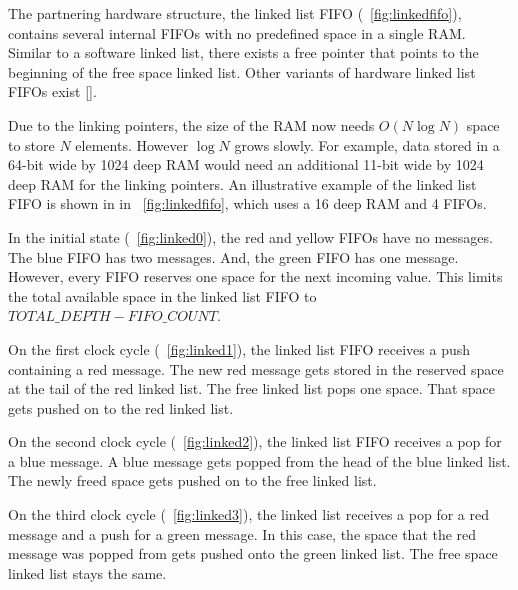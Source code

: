     The partnering hardware structure, the linked list FIFO (\figurename~\ref{fig:linkedfifo}), contains several internal FIFOs with no predefined space in a single RAM. Similar to a software linked list, there exists a free pointer that points to the beginning of the free space linked list. Other variants of hardware linked list FIFOs exist [\cite{prelim:bell2,prelim:nikologiannis}].

    Due to the linking pointers, the size of the RAM now needs $O(N\log N)$ space to store $N$ elements. However $\log N$ grows slowly. For example, data stored in a 64-bit wide by 1024 deep RAM would need an additional 11-bit wide by 1024 deep RAM for the linking pointers. An illustrative example of the linked list FIFO is shown in in \figurename~\ref{fig:linkedfifo}, which uses a 16 deep RAM and 4 FIFOs.

    In the initial state (\figurename~\ref{fig:linked0}), the red and yellow FIFOs have no messages. The blue FIFO has two messages. And, the green FIFO has one message. However, every FIFO reserves one space for the next incoming value. This limits the total available space in the linked list FIFO to $TOTAL\_DEPTH-FIFO\_COUNT$.

         On the first clock cycle (\figurename~\ref{fig:linked1}), the linked list FIFO receives a push containing a red message. The new red message gets stored in the reserved space at the tail of the red linked list. The free linked list pops one space. That space gets pushed on to the red linked list.

         On the second clock cycle (\figurename~\ref{fig:linked2}), the linked list FIFO receives a pop for a blue message. A blue message gets popped from the head of the blue linked list. The newly freed space gets pushed on to the free linked list.

         On the third clock cycle (\figurename~\ref{fig:linked3}), the linked list receives a pop for a red message and a push for a green message. In this case, the space that the red message was popped from gets pushed onto the green linked list. The free space linked list stays the same.

